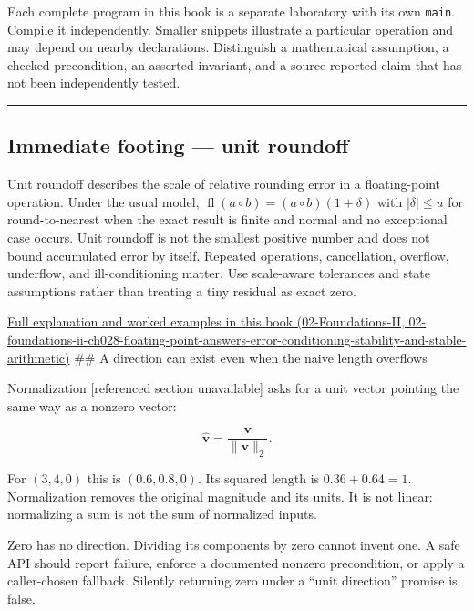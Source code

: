 Each complete program in this book is a separate laboratory with its own \texttt{main}. Compile it independently. Smaller snippets illustrate a particular operation and may depend on nearby declarations. Distinguish a mathematical assumption, a checked precondition, an asserted invariant, and a source-reported claim that has not been independently tested.

\begin{center}\rule{0.5\linewidth}{0.5pt}\end{center}

\subsection{Immediate footing --- unit roundoff}\label{01-foundations-i-ch017-immediate-footing-unit-roundoff}

Unit roundoff describes the scale of relative rounding error in a floating-point operation. Under the usual model, \(\operatorname{fl}(a\circ b)=(a\circ b)(1+\delta)\) with \(|\delta|\le u\) for round-to-nearest when the exact result is finite and normal and no exceptional case occurs. Unit roundoff is not the smallest positive number and does not bound accumulated error by itself. Repeated operations, cancellation, overflow, underflow, and ill-conditioning matter. Use scale-aware tolerances and state assumptions rather than treating a tiny residual as exact zero.

\href{../02-Foundations-II/main.pdf\#nameddest=02-foundations-ii-ch028-floating-point-answers-error-conditioning-stability-and-stable-arithmetic}{Full explanation and worked examples in this book (02-Foundations-II, 02-foundations-ii-ch028-floating-point-answers-error-conditioning-stability-and-stable-arithmetic)} \#\# A direction can exist even when the naive length overflows

{Normalization {[}referenced section unavailable{]}} asks for a unit vector pointing the same way as a nonzero vector:

\[
\widehat{\mathbf v}=\frac{\mathbf v}{\|\mathbf v\|_2}.
\]

For \((3,4,0)\) this is \((0.6,0.8,0)\). Its squared length is \(0.36+0.64=1\). Normalization removes the original magnitude and its units. It is not linear: normalizing a sum is not the sum of normalized inputs.

Zero has no direction. Dividing its components by zero cannot invent one. A safe API should report failure, enforce a documented nonzero precondition, or apply a caller-chosen fallback. Silently returning zero under a ``unit direction'' promise is false.

